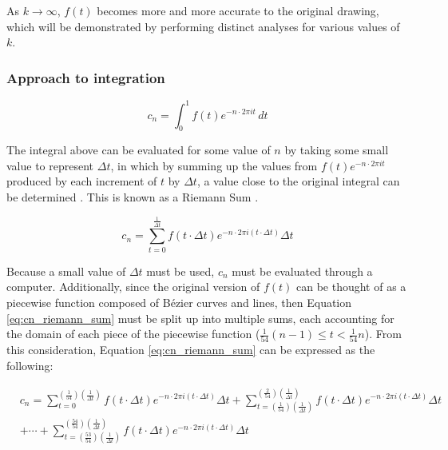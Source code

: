 \documentclass[letterpaper, 12pt]{article}
\begin{document}
As \(k \to \infty\), \(f(t)\) becomes more and more accurate to
the original drawing, which will be demonstrated by performing distinct
analyses for various values of \(k\).

\subsubsection{Approach to integration} \label{sec:approachInteg}

\begin{equation*}
    c_n = \int_{0}^{1} f(t) e^{-n \cdot 2\pi it} \,dt
\end{equation*}

The integral above can be evaluated for some value of \(n\) by
taking some small value to represent \(\Delta t\), in which
by summing up the values from \(f(t) e^{-n \cdot 2\pi it}\)
produced by each increment of \(t\) by \(\Delta t\), a value close
to the original integral can be determined \cite{sandersonWhatFourierSeries2019}.
This is known as a Riemann Sum \cite{RiemannSum2023}.

\begin{equation}
    c_n = \sum_{t = 0}^{\frac{1}{\Delta t}} f(t \cdot \Delta t) e^{-n \cdot 2\pi i(t \cdot \Delta t)} \Delta t
    \label{eq:cn_riemann_sum}
\end{equation}

Because a small value of \(\Delta t\) must be used, \(c_n\) must
be evaluated through a computer. Additionally, since the original
version of \(f(t)\) can be thought of as a piecewise function composed
of Bézier curves and lines, then Equation \ref*{eq:cn_riemann_sum}
must be split up into multiple sums, each accounting for the domain
of each piece of the piecewise function (\(\frac{1}{54}(n-1) \le t < \frac{1}{54}n\)).
From this consideration, Equation \ref*{eq:cn_riemann_sum} can be
expressed as the following:

\begin{equation}
    \begin{aligned} \label{eq:riemann_Expanded}
         & c_n = \sum_{t = 0}^{(\frac{1}{54})(\frac{1}{\Delta t})} f(t \cdot \Delta t) e^{-n \cdot 2\pi i(t \cdot \Delta t)} \Delta t
        + \sum_{t = (\frac{1}{54})(\frac{1}{\Delta t})}^{(\frac{2}{54})(\frac{1}{\Delta t})} f(t \cdot \Delta t) e^{-n \cdot 2\pi i(t \cdot \Delta t)} \Delta t
        \\
         & + \cdots
        + \sum_{t = (\frac{53}{54})(\frac{1}{\Delta t})}^{(\frac{54}{54})(\frac{1}{\Delta t})} f(t \cdot \Delta t) e^{-n \cdot 2\pi i(t \cdot \Delta t)} \Delta t
    \end{aligned}
\end{equation}
\end{document}
